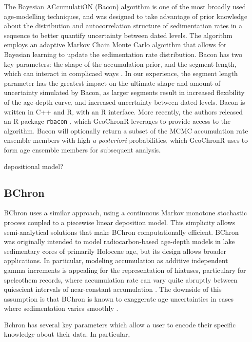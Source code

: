 \documentclass[gc, manuscript]{copernicus}
\begin{document}
The Bayesian ACcumulatiON (Bacon) algorithm \citep{bacon} is one of the
most broadly used age-modelling techniques, and was designed to take
advantage of prior knowledge about the distribution and autocorrelation
structure of sedimentation rates in a sequence to better quantify
uncertainty between dated levels. The algorithm employs an adaptive
Markov Chain Monte Carlo algorithm that allows for Bayesian learning to
update the sedimentation rate distribution. Bacon has two key
parameters: the shape of the accumulation prior, and the segment length,
which can interact in complicaed ways \citep{trachsel2017}. In our
experience, the segment length parameter has the greatest impact on the
ultimate shape and amount of uncertainty simulated by Bacon, as larger
segments result in increased flexibility of the age-depth curve, and
increased uncertainty between dated levels. Bacon is written in C++ and
R, with an R interface. More recently, the authors released an R package
\texttt{rbacon} \citep{baconPackage}, which GeoChronR leverages to
provide access to the algorithm. Bacon will optionally return a subset
of the MCMC accumulation rate ensemble members with high \emph{a
posteriori} probabilities, which GeoChronR uses to form age ensemble
members for subsequent analysis.

depositional model?

\subsection{BChron}

BChron \citep[\citet{parnell2008flexible}]{bchron} uses a similar
approach, using a continuous Markov monotone stochastic process coupled
to a piecewise linear deposition model. This simplicity allows
semi-analytical solutions that make BChron computationally efficient.
BChron was originally intended to model radiocarbon-based age-depth
models in lake sedimentary cores of primarily Holocene age, but its
design allows broader applications. In particular, modeling accumulation
as additive independent gamma increments is appealing for the
representation of hiatuses, particulary for speleothem records, where
accumulation rate can vary quite abruptly between quiescient intervals
of near-constant accumulation
\citep[\citet{PRYSM},\citet{Hu_epsl17}]{Parnell_QSR2011}. The downside
of this assumption is that BChron is known to exaggerate age
uncertainties in cases where sedimentation varies smoothly
\citep{trachsel2017}.

Bchron has several key parameters which allow a user to encode their
specific knowledge about their data. In particular,
\end{document}
